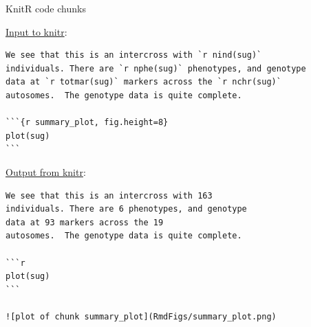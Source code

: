 \documentclass[12pt,t]{beamer}
\begin{document}
\begin{frame}[fragile]{KnitR code chunks}

\vspace{6pt}

\href{https://github.com/kbroman/Tools4RR/blob/master/03_KnitrMarkdown/Examples/example1.Rmd}{Input to knitr}:
\begin{lstlisting}
We see that this is an intercross with `r nind(sug)` 
individuals. There are `r nphe(sug)` phenotypes, and genotype
data at `r totmar(sug)` markers across the `r nchr(sug)`
autosomes.  The genotype data is quite complete.

```{r summary_plot, fig.height=8}
plot(sug)
```
\end{lstlisting}

\vfill

\href{https://github.com/kbroman/Tools4RR/blob/master/03_KnitrMarkdown/Examples/example1.md}{Output from knitr}:
\begin{lstlisting}
We see that this is an intercross with 163 
individuals. There are 6 phenotypes, and genotype
data at 93 markers across the 19
autosomes.  The genotype data is quite complete.

```r
plot(sug)
```

![plot of chunk summary_plot](RmdFigs/summary_plot.png) 
\end{lstlisting}


\end{frame}
\end{document}
